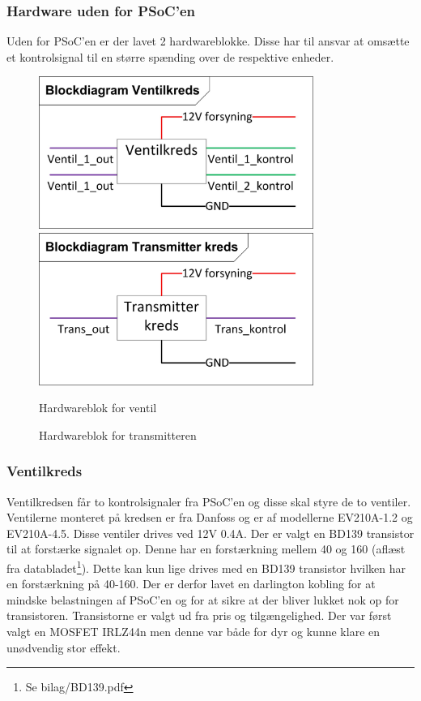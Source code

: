 \subsubsection{Hardware uden for PSoC'en}
Uden for PSoC'en er der lavet 2 hardwareblokke. Disse har til ansvar at omsætte et kontrolsignal til en større spænding over de respektive enheder.
\begin{figure}[H]
	\centering
	\begin{minipage}[b]{0.48\textwidth}\centering
	\includegraphics[width=0.80\textwidth]{billeder/Ventilblok}
	\end{minipage}
	\begin{minipage}[b]{0.48\textwidth}\centering
	\includegraphics[width=0.80\textwidth]{billeder/Transmitterblok}
	\end{minipage}
	\begin{minipage}[t]{0.48\textwidth}
	\caption{Hardwareblok for ventil}
	\label{fig:SMHW1}
	\end{minipage}
	\begin{minipage}[t]{0.48\textwidth}
	\caption{Hardwareblok for transmitteren}
	\label{fig:SMPSOC1}
	\end{minipage}
\end{figure}
\subsubsection{Ventilkreds}
Ventilkredsen får to kontrolsignaler fra PSoC'en og disse skal styre de to ventiler. Ventilerne monteret på kredsen er fra Danfoss og er af modellerne EV210A-1.2 og EV210A-4.5. Disse ventiler drives ved 12V 0.4A. Der er valgt en BD139 transistor til at forstærke signalet op. Denne har en forstærkning mellem 40 og 160 (aflæst fra databladet\footnote{Se bilag/BD139.pdf}). Dette kan kun lige drives med en BD139 transistor hvilken har en forstærkning på 40-160. Der er derfor lavet en darlington kobling for at mindske belastningen af PSoC'en og for at sikre at der bliver lukket nok op for transistoren. Transistorne er valgt ud fra pris og tilgængelighed. Der var først valgt en MOSFET IRLZ44n men denne var både for dyr og kunne klare en unødvendig stor effekt. 
